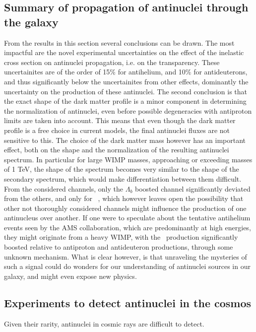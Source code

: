 \subsection{Summary of propagation of antinuclei through the galaxy}
From the results in this section several conclusions can be drawn. The most impactful are the novel experimental uncertainties on the effect of the inelastic cross section on antinuclei propagation, i.e. on the transparency. These uncertainites are of the order of 15\% for antihelium, and 10\% for antideuterons, and thus significantly below the uncertainites from other effects, dominantly the uncertainty on the production of these antinuclei. The second conclusion is that the exact shape of the dark matter profile is a minor component in determining the normalization of antinuclei, even before possible degeneracies with antiproton limits are taken into account. This means that even though the dark matter profile is a free choice in current models, the final antinuclei fluxes are not sensitive to this.  The choice of the dark matter mass however has an important effect, both on the shape and the normalization of the resulting antinuclei spectrum. In particular for large WIMP masses, approaching or exceeding masses of 1 TeV, the shape of the spectrum becomes very similar to the shape of the secondary spectrum, which would make differentiation between them difficult. From the considered channels, only the $\Lambda_b$ boosted channel significantly deviated from the others, and only for \ahe\ , which however leaves open the possibility that other not thoroughly considered channels might influence the production of one antinucleus over another. If one were to speculate about the tentative antihelium events seen by the AMS collaboration, which are predominantly at high energies, they might originate from a heavy WIMP, with the \ahe\ production significantly boosted relative to antiproton and antideuteron productions, through some unknown mechanism. What is clear however, is that unraveling the mysteries of such a signal could do wonders for our understanding of antinuclei sources in our galaxy, and might even expose new physics.   



\subsection{Experiments to detect antinuclei in the cosmos}
Given their rarity, antinuclei in cosmic rays are difficult to detect. 

